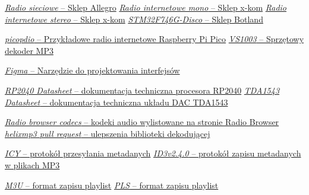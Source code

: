 \documentclass[polish]{aghengthesis}
\begin{document}
\begin{thebibliography}{9}
		\href{https://allegro.pl/oferta/adapter-radia-internetowego-dual-ir-3a-dab-fm-rds-12692108793}{\textit{Radio sieciowe} -- Sklep Allegro}
		\href{https://www.x-kom.pl/p/653480-radio-internetowe-technisat-sternradio-ir-2-biale.html}{\textit{Radio internetowe mono} -- Sklep x-kom}
		\href{https://www.x-kom.pl/p/724674-radio-internetowe-blaupunkt-ir10bt.html}{\textit{Radio internetowe stereo} -- Sklep x-kom}
		\href{https://botland.com.pl/stm32-discovery/4715-stm32f746g-disco-discovery-stm32f746ng-cortex-m7-ekran-dotykowy-pojemnosciowy-43--5904422374082.html}{\textit{STM32F746G-Disco} -- Sklep Botland}
		
		\href{https://github.com/episource/picopdio}{\textit{picopdio} -- Przykładowe radio internetowe Raspberry Pi Pico}
		\href{https://botland.com.pl/odtwarzacze-mp3-wav-ogg-midi/14308-odtwarzacz-mp3-vs1003-z-mikrofonem-5903351241786.html}{\textit{VS1003} -- Sprzętowy dekoder MP3}
		
		\href{https://www.figma.com}{\textit{Figma} -- Narzędzie do projektowania interfejsów}
		
		\href{https://datasheets.raspberrypi.com/rp2040/rp2040-datasheet.pdf}{\textit{RP2040 Datasheet} -- dokumentacja techniczna procesora RP2040}
		\href{http://www.lampizator.eu/lampizator/LINKS%20AND%20DOWNLOADS/DATAMINING/tda%201543.pdf}{\textit{TDA1543 Datasheet} -- dokumentacja techniczna układu DAC TDA1543}
		
		\href{https://www.radio-browser.info/codecs}{\textit{Radio browser codecs} -- kodeki audio wylistowane na stronie Radio Browser}
		\href{https://github.com/ultraembedded/libhelix-mp3/pull/3}{\textit{helixmp3 pull request} -- ulepszenia biblioteki dekodującej}
		
		\href{https://gist.github.com/niko/2a1d7b2d109ebe7f7ca2f860c3505ef0#file-icy_meta-md}{\textit{ICY} -- protokół przesyłania metadanych}
		\href{https://mutagen-specs.readthedocs.io/en/latest/id3/id3v2.4.0-structure.html}{\textit{ID3v2.4.0} -- protokół zapisu metadanych w plikach MP3}
		
		\href{https://en.wikipedia.org/wiki/M3U}{\textit{M3U} -- format zapisu playlist}
		\href{https://en.wikipedia.org/wiki/PLS_(file_format)}{\textit{PLS} -- format zapisu playlist}
		

\end{thebibliography}
\end{document}
